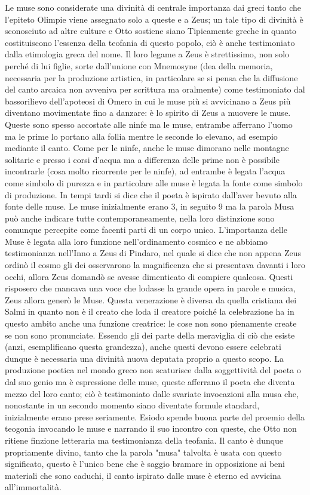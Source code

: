 \documentclass[10pt,a4paper]{article}
\begin{document}
Le muse sono considerate una divinità di centrale importanza dai greci tanto che l'epiteto Olimpie viene assegnato solo a queste e a Zeus; un tale tipo di divinità è sconosciuto ad altre culture e Otto sostiene siano Tipicamente greche in quanto costituiscono l'essenza della teofania di questo popolo, ciò è anche testimoniato dalla etimologia greca del nome. Il loro legame a Zeus è strettissimo, non solo perché di lui figlie, sorte dall'unione con Mnemosyne (dea della memoria, necessaria per la produzione artistica, in particolare se si pensa che la diffusione del canto arcaica non avveniva per scrittura ma oralmente) come testimoniato dal bassorilievo dell'apoteosi di Omero in cui le muse più si avvicinano a Zeus più diventano movimentate fino a danzare: è lo spirito di Zeus a muovere le muse. Queste sono spesso accostate alle ninfe ma le muse, entrambe afferrano l'uomo ma le prime lo portano alla follia mentre le seconde lo elevano, ad esempio mediante il canto. Come per le ninfe, anche le muse dimorano nelle montagne solitarie e presso i corsi d'acqua ma a differenza delle prime non è possibile incontrarle (cosa molto ricorrente per le ninfe), ad entrambe è legata l'acqua come simbolo di purezza e in particolare alle muse è legata la fonte come simbolo di produzione. In tempi tardi si dice che il poeta è ispirato dall'aver bevuto alla fonte delle muse. Le muse inizialmente erano 3, in seguito 9 ma la parola Musa può anche indicare tutte contemporaneamente, nella loro distinzione sono comunque percepite come facenti parti di un corpo unico. L'importanza delle Muse è legata alla loro funzione nell'ordinamento cosmico e ne abbiamo testimonianza nell'Inno a Zeus di Pindaro, nel quale si dice che non appena Zeus ordinò il cosmo gli dei osservarono la magnificenza che si presentava davanti i loro occhi, allora Zeus domandò se avesse dimenticato di compiere qualcosa. Questi risposero che mancava una voce che lodasse la grande opera in parole e musica, Zeus allora generò le Muse. Questa venerazione è diversa da quella cristiana dei Salmi in quanto non è il creato che loda il creatore poiché la celebrazione ha in questo ambito anche una funzione creatrice: le cose non sono pienamente create se non sono pronunciate. Essendo gli dei parte della meraviglia di ciò che esiste (anzi, esemplificano questa grandezza), anche questi devono essere celebrati dunque è necessaria una divinità nuova deputata proprio a questo scopo. La produzione poetica nel mondo greco non scaturisce dalla soggettività del poeta o dal suo genio ma è espressione delle muse, queste afferrano il poeta che diventa mezzo del loro canto; ciò è testimoniato dalle svariate invocazioni alla musa che, nonostante in un secondo momento siano diventate formule standard, inizialmente erano prese seriamente. Esiodo spende buona parte del proemio della teogonia invocando le muse e narrando il suo incontro con queste, che Otto non ritiene finzione letteraria ma testimonianza della teofania. Il canto è dunque propriamente divino, tanto che la parola "musa" talvolta è usata con questo significato, questo è l'unico bene che è saggio bramare in opposizione ai beni materiali che sono caduchi, il canto ispirato dalle muse è eterno ed avvicina all'immortalità.\\
\end{document}
